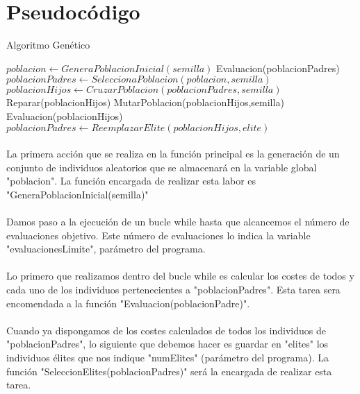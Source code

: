 	\section{Pseudocódigo}
	
	
		\begin{algorithm}[H]
			\caption{Algoritmo Genético}
			\begin{algorithmic}
				\STATE $poblacion \leftarrow GeneraPoblacionInicial(semilla)$
				\STATE Evaluacion(poblacionPadres)
					\STATE $poblacionPadres \leftarrow SeleccionaPoblacion(poblacion,semilla)$
					\STATE $poblacionHijos \leftarrow CruzarPoblacion(poblacionPadres,semilla)$
					\STATE Reparar(poblacionHijos)
					\STATE MutarPoblacion(poblacionHijos,semilla)
					\STATE Evaluacion(poblacionHijos)
					\STATE $poblacionPadres \leftarrow ReemplazarElite(poblacionHijos, elite)$
				\ENDWHILE	
			\end{algorithmic}
		\end{algorithm}
	
	\paragraph{}La primera acción que se realiza en la función principal es la generación de un conjunto de individuos aleatorios que se almacenará en la variable global "poblacion". La función encargada de realizar esta labor es "GeneraPoblacionInicial(semilla)"
	
	\paragraph{}Damos paso a la ejecución de un bucle while hasta que alcancemos el número de evaluaciones objetivo. Este número de evaluaciones lo indica la variable "evaluacionesLimite", parámetro del programa.
	
	\paragraph{}Lo primero que realizamos dentro del bucle while es calcular los costes de todos y cada uno de los individuos pertenecientes a "poblacionPadres". Esta tarea sera encomendada a la función "Evaluacion(poblacionPadre)".
	
	\paragraph{} Cuando ya dispongamos de los costes calculados de todos los individuos de "poblacionPadres", lo siguiente que debemos hacer es guardar en "elites" los individuos élites que nos indique "numElites" (parámetro del programa). La función "SeleccionElites(poblacionPadres)" será la encargada de realizar esta tarea.

